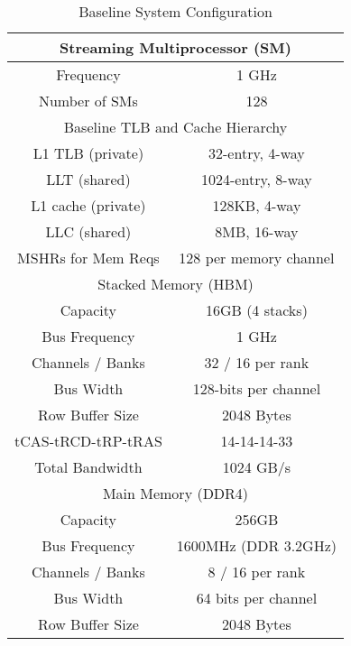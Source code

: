 \begin {table}[h]
\begin{center} 
\vspace{-0.1in}
\caption{Baseline System Configuration}
\vspace{-0. in}
\begin{tabular}{|c|c|}
\hline
     \multicolumn{2}{|c|}{Streaming Multiprocessor (SM)}               \\ \hline
     Frequency            &  1 GHz                                    \\ 
     Number of SMs        &  128                                        \\ \hline
     \multicolumn{2}{|c|}{Baseline TLB and Cache Hierarchy}            \\ \hline
     L1 TLB   (private)   &  32-entry, 4-way                \\ 
     LLT      (shared)    &  1024-entry, 8-way            \\ \hline
     L1 cache (private)   &  128KB,  4-way   \\ 
     LLC      (shared)    &  8MB, 16-way  \\
     MSHRs for Mem Reqs   &  128 per memory channel  \\ \hline
     \multicolumn{2}{|c|}{Stacked Memory (HBM)}            \\ \hline
     Capacity             &  16GB (4 stacks)          \\
     Bus Frequency        &  1 GHz     \\ 
     Channels / Banks    &  32  / 16 per rank        \\
     Bus Width            &  128-bits per channel    \\ 
     Row Buffer Size      &  2048 Bytes              \\
     \small{tCAS-tRCD-tRP-tRAS}   &  14-14-14-33     \\ 
     Total Bandwidth      &  1024 GB/s              \\ \hline
     \multicolumn{2}{|c|}{Main Memory (DDR4)}               \\ \hline
     Capacity             &  256GB                   \\
     Bus Frequency        &  1600MHz (DDR 3.2GHz)    \\ 
     Channels / Banks    &  8  / 16 per rank        \\
     Bus Width            &  64 bits per channel     \\ 
     Row Buffer Size      &  2048 Bytes              \\

\end{tabular}
\end{center}
\end{table}
